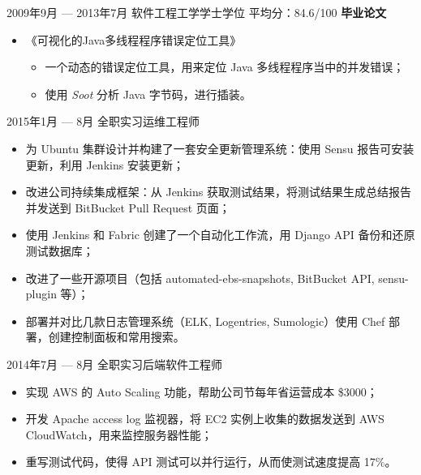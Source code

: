 \documentclass{newresume}
\begin{document}
\begin{body}
\begin{itemize}
	\end{itemize}

	\smallskip
	{2009年9月 --- 2013年7月}
	{软件工程工学学士学位}
	{平均分：84.6/100}
	\textbf{毕业论文}
	\begin{itemize}
	\item 《可视化的Java多线程程序错误定位工具》
	\begin{itemize}
		\item 一个动态的错误定位工具，用来定位 Java 多线程程序当中的并发错误；
		\item 使用 \textit{Soot} 分析 Java 字节码，进行插装。
	\end{itemize}
	\end{itemize}
\end{body}

\smallskip

\begin{body}
	{2015年1月 --- 8月}
	{全职实习运维工程师}{}
	\begin{itemize}[noitemsep,topsep=0pt]
		\item 为 Ubuntu 集群设计并构建了一套安全更新管理系统：使用 Sensu 报告可安装更新，利用 Jenkins 安装更新；
		\item 改进公司持续集成框架：从 Jenkins 获取测试结果，将测试结果生成总结报告并发送到 BitBucket Pull Request 页面；
		\item 使用 Jenkins 和 Fabric 创建了一个自动化工作流，用 Django API 备份和还原测试数据库；
		\item 改进了一些开源项目（包括 automated-ebs-snapshots, BitBucket API, sensu-plugin 等）；
		\item 部署并对比几款日志管理系统（ELK, Logentries, Sumologic）使用 Chef 部署，创建控制面板和常用搜索。
	\end{itemize}
\end{body}

\begin{body}
	{2014年7月 --- 8月}
	{全职实习后端软件工程师}{}
	\begin{itemize}[noitemsep,topsep=0pt]
		\item 实现 AWS 的 Auto Scaling 功能，帮助公司节每年省运营成本 \$3000；
		\item 开发 Apache access log 监视器，将 EC2 实例上收集的数据发送到 AWS CloudWatch，用来监控服务器性能；
		\item 重写测试代码，使得 API 测试可以并行运行，从而使测试速度提高 17\%。
	\end{itemize}
\end{body}
\end{document}
